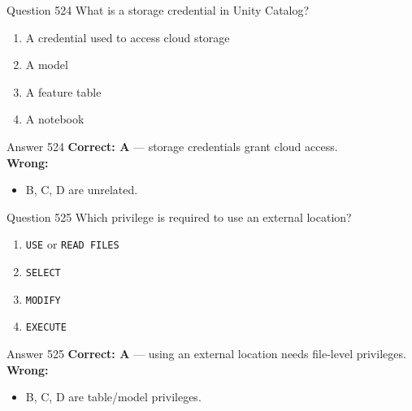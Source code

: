 \documentclass[aspectratio=169,11pt]{beamer}
\begin{document}
	\begin{frame}{Question 524}
		What is a storage credential in Unity Catalog?
		\begin{enumerate}[label=\Alph*.]
			\item A credential used to access cloud storage
			\item A model
			\item A feature table
			\item A notebook
		\end{enumerate}
	\end{frame}
	\begin{frame}{Answer 524}
		\textbf{Correct: A} --- storage credentials grant cloud access.\\
		\vspace{0.5em}
		\textbf{Wrong:}
		\begin{itemize}
			\item B, C, D are unrelated.
		\end{itemize}
	\end{frame}
	
	\begin{frame}{Question 525}
		Which privilege is required to use an external location?
		\begin{enumerate}[label=\Alph*.]
			\item \texttt{USE} or \texttt{READ FILES}
			\item \texttt{SELECT}
			\item \texttt{MODIFY}
			\item \texttt{EXECUTE}
		\end{enumerate}
	\end{frame}
	\begin{frame}{Answer 525}
		\textbf{Correct: A} --- using an external location needs file-level privileges.\\
		\vspace{0.5em}
		\textbf{Wrong:}
		\begin{itemize}
			\item B, C, D are table/model privileges.
		\end{itemize}
	\end{frame}
	
\end{document}
